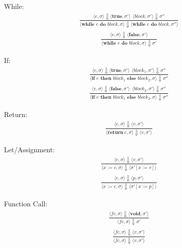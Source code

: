 \documentclass[12pt]{article}
\begin{document}
	
	While:
	\begin{align*}
		\frac{\langle e, \sigma \rangle\Downarrow \langle \textbf{true}, \sigma' \rangle \ \
		\langle block, \sigma' \rangle\Downarrow \sigma''}
		{\langle \textbf{while } e \textbf{ do } block, \sigma \rangle\Downarrow \langle \textbf{while } e \textbf{ do } block, \sigma'' \rangle}
	\end{align*}
	\begin{align*}
		\frac{\langle e, \sigma \rangle\Downarrow \langle \textbf{false}, \sigma' \rangle}
		{\langle \textbf{while } e \textbf{ do } block, \sigma \rangle\Downarrow \sigma'}
	\end{align*}

	If:
	\begin{align*}
		\frac{\langle e, \sigma \rangle\Downarrow \langle \textbf{true}, \sigma' \rangle \ \
		\langle block_1, \sigma' \rangle\Downarrow \sigma''}
		{\langle \textbf{if } e \textbf{ then } block_1 \textbf{ else } block_2, \sigma \rangle\Downarrow \sigma''}
	\end{align*}
	\begin{align*}
		\frac{\langle e, \sigma \rangle\Downarrow \langle \textbf{false}, \sigma' \rangle \ \
		\langle block_2, \sigma' \rangle\Downarrow \sigma''}
		{\langle \textbf{if } e \textbf{ then } block_1 \textbf{ else } block_2, \sigma \rangle\Downarrow \sigma''}
	\end{align*}

	Return:
	\begin{align*}
		\frac{\langle e, \sigma \rangle\Downarrow \langle v, \sigma' \rangle}
		{\langle \textbf{return}\ e, \sigma \rangle\Downarrow \langle v, \sigma' \rangle}
	\end{align*}

	Let/Assignment:
	\begin{align*}
		\frac{\langle e, \sigma \rangle\Downarrow \langle v, \sigma' \rangle}
		{\langle x := e, \sigma \rangle\Downarrow \langle \sigma' [x := v] \rangle}
	\end{align*}
	\begin{align*}
		\frac{\langle e, \sigma \rangle\Downarrow \langle p, \sigma' \rangle}
		{\langle x := e, \sigma \rangle\Downarrow \langle \sigma' [x := p] \rangle}
	\end{align*}

	Function Call:
	\begin{align*}
		\frac{\langle fc, \sigma \rangle\Downarrow \langle \textbf{void}, \sigma' \rangle}
		{\langle fc, \sigma \rangle\Downarrow \sigma'}
	\end{align*}
	\begin{align*}
		\frac{\langle fc, \sigma \rangle\Downarrow \langle v, \sigma' \rangle}
		{\langle fc, \sigma \rangle\Downarrow \langle v, \sigma' \rangle}
	\end{align*}
\end{document}
